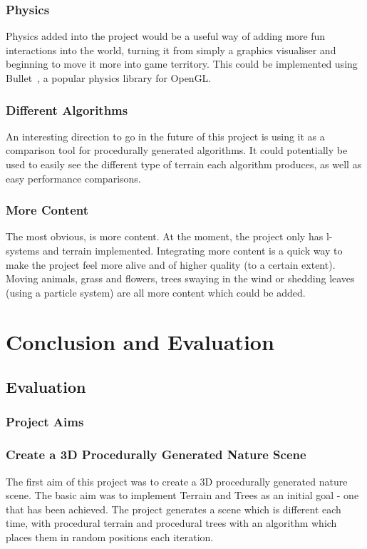 \documentclass[a4paper,10pt]{report}
\begin{document}
\subsection{Physics}

Physics added into the project would be a useful way of adding more fun interactions into the world, turning it from simply a graphics visualiser and beginning to move it more into game territory. This could be implemented using Bullet~\cite{coumans2013bullet}, a popular physics library for OpenGL. 

\subsection{Different Algorithms}
An interesting direction to go in the future of this project is using it as a comparison tool for procedurally generated algorithms. It could potentially be used to easily see the different type of terrain each algorithm produces, as well as easy performance comparisons. 

\subsection{More Content}
The  most obvious, is more content. At the moment, the project only has l-systems and terrain implemented. Integrating more content is a quick way to make the project feel more alive and of higher quality (to a certain extent). Moving animals, grass and flowers, trees swaying in the wind or shedding leaves (using a particle system) are all more content which could be added.

\chapter{Conclusion and Evaluation}
\section{Evaluation}

\subsection{Project Aims}
\subsection{Create a 3D Procedurally Generated Nature Scene}
The first aim of this project was to create a 3D procedurally generated nature scene. The basic aim was to implement Terrain and Trees as an initial goal - one that has been achieved. The project generates a scene which is different each time, with procedural terrain and procedural trees with an algorithm which places them in random positions each iteration. \medskip
\end{document}
